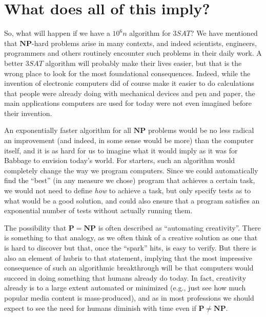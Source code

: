 \section{What does all of this imply?}\label{What-does-all-of-this-imp}

So, what will happen if we have a \(10^6n\) algorithm for
\(3\ensuremath{\mathit{SAT}}\)? We have mentioned that
\(\mathbf{NP}\)-hard problems arise in many contexts, and indeed
scientists, engineers, programmers and others routinely encounter such
problems in their daily work. A better \(3\ensuremath{\mathit{SAT}}\)
algorithm will probably make their lives easier, but that is the wrong
place to look for the most foundational consequences. Indeed, while the
invention of electronic computers did of course make it easier to do
calculations that people were already doing with mechanical devices and
pen and paper, the main applications computers are used for today were
not even imagined before their invention.

An exponentially faster algorithm for all \(\mathbf{NP}\) problems would
be no less radical an improvement (and indeed, in some sense would be
more) than the computer itself, and it is as hard for us to imagine what
it would imply as it was for Babbage to envision today's world. For
starters, such an algorithm would completely change the way we program
computers. Since we could automatically find the ``best'' (in any
measure we chose) program that achieves a certain task, we would not
need to define \emph{how} to achieve a task, but only specify tests as
to what would be a good solution, and could also ensure that a program
satisfies an exponential number of tests without actually running them.

The possibility that \(\mathbf{P}=\mathbf{NP}\) is often described as
``automating creativity''. There is something to that analogy, as we
often think of a creative solution as one that is hard to discover but
that, once the ``spark'' hits, is easy to verify. But there is also an
element of hubris to that statement, implying that the most impressive
consequence of such an algorithmic breakthrough will be that computers
would succeed in doing something that humans already do today. In fact,
creativity already is to a large extent automated or minimized (e.g.,
just see how much popular media content is mass-produced), and as in
most professions we should expect to see the need for humans diminish
with time even if \(\mathbf{P}\neq \mathbf{NP}\).

